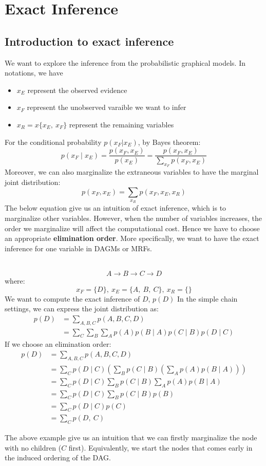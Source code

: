 \section{Exact Inference}
\subsection{Introduction to exact inference}
We want to explore the inference from the probabilistic graphical models. In notations, we have
\begin{itemize}
    \item $x_E$ represent the observed evidence
    \item $x_F$ represent the unobserved varaible we want to infer
    \item $x_R=x\{x_E,\:x_F\}$ represent the remaining variables
\end{itemize} 
For the conditional probability $p(x_F|x_E)$, by Bayes theorem:
$$p\left(x_F \mid x_E\right)=\frac{p\left(x_F, x_E\right)}{p\left(x_E\right)}=\frac{p\left(x_F, x_E\right)}{\sum_{x_F} p\left(x_F, x_E\right)}$$
Moreover, we can also marginalize the extraneous variables to have the marginal joint distribution:
$$p\left(x_F, x_E\right)=\sum_{x_R} p\left(x_F, x_E, x_R\right)$$
The below equation give us an intuition of exact inference, which is to marginalize other variables. However, when the number of variables increases, the order we marginalize will affect the computational cost. Hence we have to choose an appropriate \textbf{elimination order}. More specifically, we want to have the exact inference for one variable in DAGMs or MRFs.
\begin{example}
    \\
    $$A \rightarrow B \rightarrow C \rightarrow D$$
    where:
    $$x_F=\{D\},\:x_E=\{A,\:B,\:C\},\:x_R=\{\}$$
    We want to compute the exact inference of $D$, $p(D)$
    In the simple chain settings, we can express the joint distribution as:
    \begin{align*}
        p(D)&=\sum_{A,B,C}p(A,B,C,D)\\
        &=\sum_C \sum_B \sum_A p(A) p(B \mid A) p(C \mid B) p(D \mid C)
    \end{align*}
    If we choose an elimination order:
    \begin{align*}
        p(D)&=\sum_{A,B,C}p(A,B,C,D)\\
        &=\sum_C p(D \mid C)\left(\sum_B p(C \mid B)\left(\sum_A p(A) p(B \mid A)\right)\right)\\
        &=\sum_C p(D \mid C) \sum_B p(C \mid B) \sum_A p(A) p(B \mid A) \\
        & =\sum_C p(D \mid C) \sum_B p(C \mid B) p(B) \\
        & =\sum_C p(D \mid C) p(C)\\
        & =\sum_C p(D,\:C)
    \end{align*}
\end{example}
The above example give us an intuition that we can firstly marginalize the node with no children ($C$ first). Equivalently, we start the nodes that comes early in the induced ordering of the DAG.
